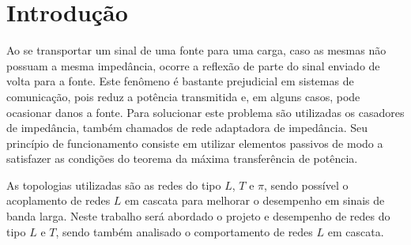 \newpage

\section{Introdução}
Ao se transportar um sinal de uma fonte para uma carga, caso as mesmas não possuam a mesma impedância, ocorre a reflexão de parte do sinal enviado de volta para a fonte. Este fenômeno é bastante prejudicial em sistemas de comunicação, pois reduz a potência transmitida e, em alguns casos, pode ocasionar danos a fonte. Para solucionar este problema são utilizadas os casadores de impedância, também chamados de rede adaptadora de impedância. Seu princípio de funcionamento consiste em utilizar elementos passivos de modo a satisfazer as condições do teorema da máxima transferência de potência. 

As topologias utilizadas são as redes do tipo $L$, $T$ e $\pi$, sendo possível o acoplamento de redes $L$ em cascata para melhorar o desempenho em sinais de banda larga.
Neste trabalho será abordado o projeto e desempenho de redes do tipo $L$ e $T$, sendo também analisado o comportamento de redes $L$ em cascata.